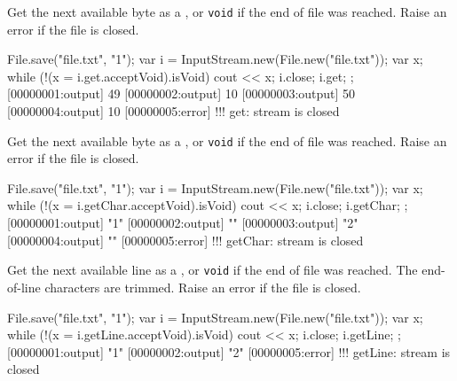 \begin{urbiscriptapi}
\item[get]%
  Get the next available byte as a , or \lstinline|void| if
  the end of file was reached.  Raise an error if the file is closed.
\begin{urbiscript}
{
  File.save("file.txt", "1\n");
  var i = InputStream.new(File.new("file.txt"));
  var x;
  while (!(x = i.get.acceptVoid).isVoid)
    cout << x;
  i.close;
  i.get;
};
[00000001:output] 49
[00000002:output] 10
[00000003:output] 50
[00000004:output] 10
[00000005:error] !!! get: stream is closed
\end{urbiscript}

\item[getChar]%
  Get the next available byte as a , or \lstinline|void|
  if the end of file was reached.  Raise an error if the file is closed.
\begin{urbiscript}
{
  File.save("file.txt", "1\n");
  var i = InputStream.new(File.new("file.txt"));
  var x;
  while (!(x = i.getChar.acceptVoid).isVoid)
    cout << x;
  i.close;
  i.getChar;
};
[00000001:output] "1"
[00000002:output] "\n"
[00000003:output] "2"
[00000004:output] "\n"
[00000005:error] !!! getChar: stream is closed
\end{urbiscript}

\item[getLine]%
  Get the next available line as a , or \lstinline|void|
  if the end of file was reached.  The end-of-line characters are trimmed.
  Raise an error if the file is closed.
\begin{urbiscript}
{
  File.save("file.txt", "1\n");
  var i = InputStream.new(File.new("file.txt"));
  var x;
  while (!(x = i.getLine.acceptVoid).isVoid)
    cout << x;
  i.close;
  i.getLine;
};
[00000001:output] "1"
[00000002:output] "2"
[00000005:error] !!! getLine: stream is closed
\end{urbiscript}
\end{urbiscriptapi}


